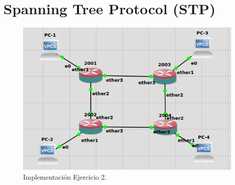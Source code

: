 \documentclass[letterpaper,12pt]{article}
\begin{document}
\section{Spanning Tree Protocol (STP)}
\begin{figure}[H] 
        \centering \includegraphics[width=0.6\columnwidth]{lab13.png}
        \caption{
                \label{fig:samplesetup} 
                Implementación Ejercicio 2.
        }
    \end{figure}
\end{document}
